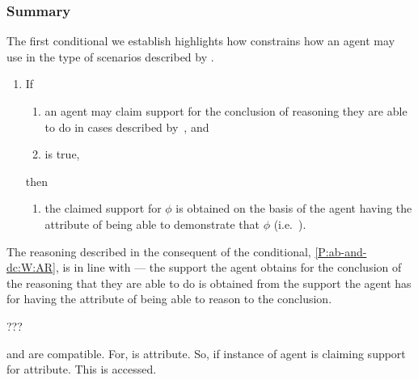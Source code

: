 \subsubsection{Summary}
\label{sec:uRa-and-wr-summary}

\begin{note}[Conditional A]
  The first conditional we establish highlights how \ESU{} constrains how an agent may use \gsi{} in the type of scenarios described by \eA{}.

  \begin{proposition}[\mcA{}]
  \begin{enumerate}[label=(C\Alph*), ref=(C\Alph*), series=CC_counter]
  \item\label{P:ab-and-dc:W} If
    \begin{enumerate}[label=(\roman*), ref=(CA.\roman*), series=CCA_counter]
    \item\label{P:ab-and-dc:W:ab} an agent may claim support for the conclusion of reasoning they are able to do in cases described by~\eA{}, and
    \item\label{P:ab-and-dc:W:uRa} \ESU{} is true,
    \end{enumerate}
    then
    \begin{enumerate}[label=(\roman*), ref=(CA.\roman*), resume*=CCA_counter]
    \item\label{P:ab-and-dc:W:AR} the claimed support for \(\phi\) is obtained on the basis of the agent having the attribute of being able to demonstrate that \(\phi\) (i.e.\ \AR{}).
    \end{enumerate}
  \end{enumerate}
  \vspace{-\topsep}\vspace{-\topsep}
\end{proposition}

  The reasoning described in the consequent of the conditional, \ref{P:ab-and-dc:W:AR}, is in line with \AR{} --- the support the agent obtains for the conclusion of the reasoning that they are able to do is obtained from the support the agent has for having the attribute of being able to reason to the conclusion.
\end{note}

\begin{note}[Summarising]
  ???
\end{note}

\begin{note}
  \AR{} and \ESU{} are compatible.
  For, \AR{} is attribute.
  So, if instance of \AR{} agent is claiming support for attribute.
  This is accessed.
\end{note}


